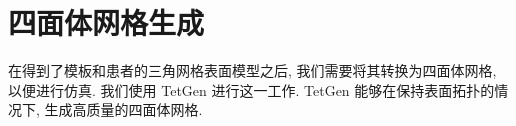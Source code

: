 \section{四面体网格生成}

在得到了模板和患者的三角网格表面模型之后, 我们需要将其转换为四面体网格, 以便进行仿真.
我们使用 TetGen \cite{siTetGenDelaunaybasedQuality2015} 进行这一工作.
TetGen 能够在保持表面拓扑的情况下, 生成高质量的四面体网格.
